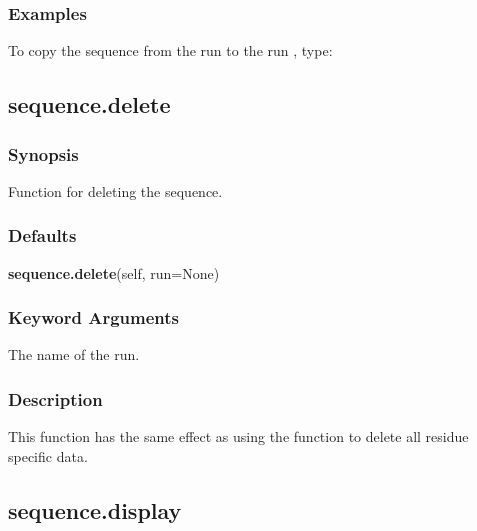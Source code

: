   
 \subsubsection{Examples} 

 To copy the sequence from the run  to the run , type: 
  



  

 \newpage 

 \subsection{sequence.delete} 

  
 \subsubsection{Synopsis} 

 Function for deleting the sequence. 
  

  
 \subsubsection{Defaults} 

 \textsf{\textbf{sequence.delete}(self, run=None)} 

  
 \subsubsection{Keyword Arguments} 

   The name of the run.  

  

  
 \subsubsection{Description} 

 This function has the same effect as using the  function to delete all residue specific data. 
  

  

 \newpage 

 \subsection{sequence.display} 

